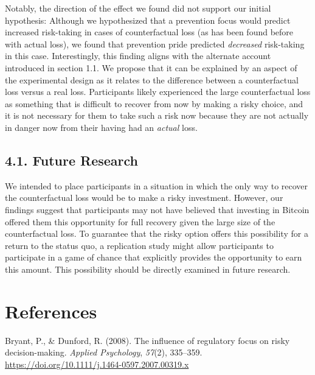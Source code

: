 \documentclass[man,floatsintext]{apa6}
\begin{document}
Notably, the direction of the effect we found did not support our initial hypothesis: Although we hypothesized that a prevention focus would predict increased risk-taking in cases of counterfactual loss (as has been found before with actual loss), we found that prevention pride predicted \emph{decreased} risk-taking in this case. Interestingly, this finding aligns with the alternate account introduced in section 1.1. We propose that it can be explained by an aspect of the experimental design as it relates to the difference between a counterfactual loss versus a real loss. Participants likely experienced the large counterfactual loss as something that is difficult to recover from now by making a risky choice, and it is not necessary for them to take such a risk now because they are not actually in danger now from their having had an \emph{actual} loss.

\hypertarget{future-research}{%
\subsection{4.1. Future Research}\label{future-research}}

We intended to place participants in a situation in which the only way to recover the counterfactual loss would be to make a risky investment. However, our findings suggest that participants may not have believed that investing in Bitcoin offered them this opportunity for full recovery given the large size of the counterfactual loss. To guarantee that the risky option offers this possibility for a return to the status quo, a replication study might allow participants to participate in a game of chance that explicitly provides the opportunity to earn this amount. This possibility should be directly examined in future research.

\newpage

\hypertarget{references}{%
\section{References}\label{references}}

\begingroup
\setlength{\parindent}{-0.5in}
\setlength{\leftskip}{0.5in}

\hypertarget{refs}{}
\leavevmode\hypertarget{ref-bryantdunford2008}{}%
Bryant, P., \& Dunford, R. (2008). The influence of regulatory focus on risky decision-making. \emph{Applied Psychology}, \emph{57}(2), 335--359. \url{https://doi.org/10.1111/j.1464-0597.2007.00319.x}
\end{document}
